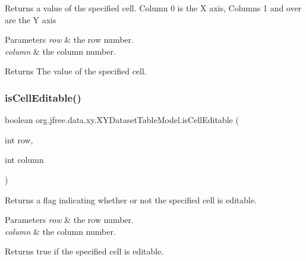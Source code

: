 Returns a value of the specified cell. Column 0 is the X axis, Columns 1 and over are the Y axis


\begin{DoxyParams}{Parameters}
{\em row} & the row number. \\
\hline
{\em column} & the column number.\\
\hline
\end{DoxyParams}
\begin{DoxyReturn}{Returns}
The value of the specified cell. 
\end{DoxyReturn}
\mbox{\label{classorg_1_1jfree_1_1data_1_1xy_1_1_x_y_dataset_table_model_ae13759ba0b9ded0dbea366acad4b6d10}} 
\subsubsection{\texorpdfstring{is\+Cell\+Editable()}{isCellEditable()}}
{\footnotesize\ttfamily boolean org.\+jfree.\+data.\+xy.\+X\+Y\+Dataset\+Table\+Model.\+is\+Cell\+Editable (\begin{DoxyParamCaption}\item[{int}]{row,  }\item[{int}]{column }\end{DoxyParamCaption})}

Returns a flag indicating whether or not the specified cell is editable.


\begin{DoxyParams}{Parameters}
{\em row} & the row number. \\
\hline
{\em column} & the column number.\\
\hline
\end{DoxyParams}
\begin{DoxyReturn}{Returns}
{\ttfamily true} if the specified cell is editable. 
\end{DoxyReturn}
\mbox{\label{classorg_1_1jfree_1_1data_1_1xy_1_1_x_y_dataset_table_model_a1c2b919f81f70fabe2985a61c82e8645}} 
